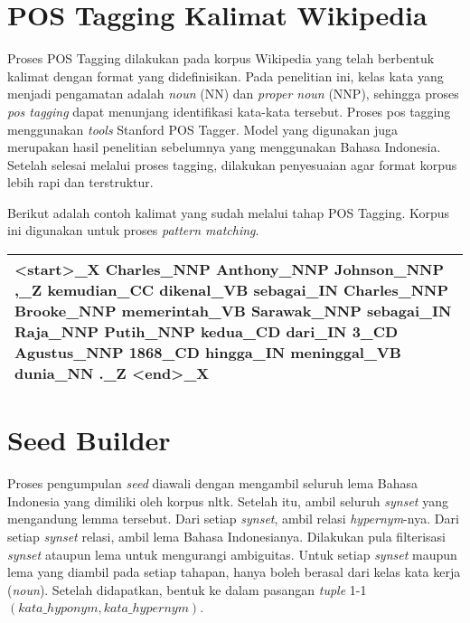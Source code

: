 \section{POS Tagging Kalimat Wikipedia}
Proses POS Tagging dilakukan pada korpus Wikipedia yang telah berbentuk kalimat dengan format yang didefinisikan. Pada penelitian ini, kelas kata yang menjadi pengamatan adalah \textit{noun} (NN) dan \textit{proper noun} (NNP), sehingga proses \textit{pos tagging} dapat menunjang identifikasi kata-kata tersebut. Proses pos tagging menggunakan \textit{tools} Stanford POS Tagger. Model yang digunakan juga merupakan hasil penelitian sebelumnya yang menggunakan Bahasa Indonesia.  Setelah selesai melalui proses tagging, dilakukan penyesuaian agar format korpus lebih rapi dan terstruktur. 

Berikut adalah contoh kalimat yang sudah melalui tahap POS Tagging. Korpus ini digunakan untuk proses \textit{pattern matching}.
\begin{center}
\begin{tabular}{ | m{32em} | } 
\hline
<start>\_X Charles\_NNP Anthony\_NNP Johnson\_NNP ,\_Z kemudian\_CC dikenal\_VB sebagai\_IN Charles\_NNP Brooke\_NNP memerintah\_VB Sarawak\_NNP sebagai\_IN Raja\_NNP Putih\_NNP kedua\_CD dari\_IN 3\_CD Agustus\_NNP 1868\_CD hingga\_IN meninggal\_VB dunia\_NN .\_Z <end>\_X \\ 
\hline
\end{tabular}
\end{center}


\section{Seed Builder}
Proses pengumpulan \textit{seed} diawali dengan mengambil seluruh lema Bahasa Indonesia yang dimiliki oleh korpus nltk. Setelah itu, ambil seluruh \textit{synset} yang mengandung lemma tersebut. Dari setiap \textit{synset}, ambil relasi \textit{hypernym}-nya. Dari setiap \textit{synset} relasi, ambil lema Bahasa Indonesianya. Dilakukan pula filterisasi \textit{synset} ataupun lema untuk mengurangi ambiguitas. Untuk setiap \textit{synset} maupun lema yang diambil pada setiap tahapan, hanya boleh berasal dari kelas kata kerja (\textit{noun}). Setelah didapatkan, bentuk ke dalam pasangan \textit{tuple} 1-1 $(kata\_hyponym,kata\_hypernym)$.

